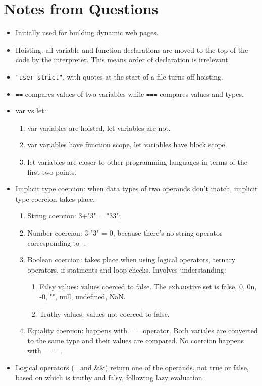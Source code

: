 \documentclass{report}
\begin{document}
\section{Notes from Questions}
\begin{itemize}
\item Initially used for building dynamic web pages.
\item Hoisting: all variable and function declarations are moved to the top of the code by the interpreter. This means order of declaration is irrelevant.
\item \texttt{"user strict"}, with quotes at the start of a file turns off hoisting.
\item \texttt{==} compares values of two variables while \texttt{===} compares values and types.
\item var vs let:
\begin{enumerate}
    \item var variables are hoisted, let variables are not.
    \item var variables have function scope, let variables have block scope.
    \item let variables are closer to other programming languages in terms of the first two points.
\end{enumerate}
\item Implicit type coercion: when data types of two operands don't match, implicit type coercion takes place.
\begin{enumerate}
    \item String coercion: 3+"3" = "33";
    \item Number coercion: 3-"3" = 0, because there's no string operator corresponding to -.
    \item Boolean coercion: takes place when using logical operators, ternary operators, if statments and loop checks. Involves understanding:
    \begin{enumerate}
        \item Falsy values: values coerced to false. The exhaustive set is false, 0, 0n, -0, "", null, undefined, NaN.
        \item Truthy values: values not coerced to false.
    \end{enumerate}
    \item Equality coercion: happens with == operator. Both variales are converted to the same type and their values are compared. No coercion happens with ===.
\end{enumerate}
\item Logical operators ($||$ and \&\&) return one of the operands, not true or false, based on which is truthy and falsy, following lazy evaluation.

\end{itemize}
\end{document}
